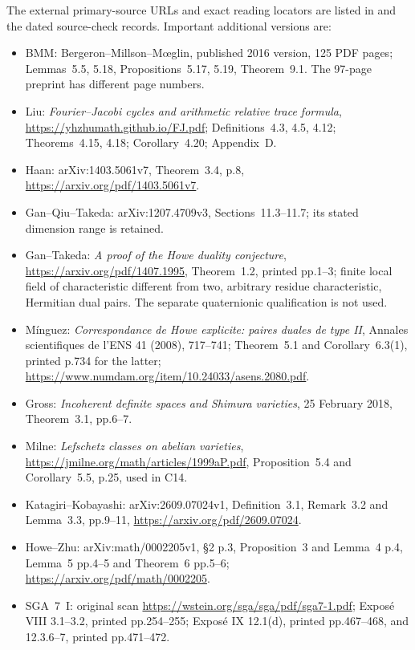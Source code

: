 \documentclass[11pt]{article}
\theoremstyle{definition}\newtheorem{definition}[theorem]{Definition}\newtheorem{remark}[theorem]{Remark}
\begin{document}
The external primary-source URLs and exact reading locators are
listed in  and the
dated source-check records. Important additional versions are:
\begin{itemize}[leftmargin=*]
\item BMM: Bergeron--Millson--M\oe glin, published 2016 version,
125 PDF pages; Lemmas~5.5, 5.18, Propositions~5.17, 5.19,
Theorem~9.1. The 97-page preprint has different page numbers.
\item Liu: \emph{Fourier--Jacobi cycles and arithmetic relative
trace formula}, \url{https://yhzhumath.github.io/FJ.pdf};
Definitions~4.3, 4.5, 4.12; Theorems~4.15, 4.18;
Corollary~4.20; Appendix~D.
\item Haan: arXiv:1403.5061v7, Theorem~3.4, p.8,
\url{https://arxiv.org/pdf/1403.5061v7}.
\item Gan--Qiu--Takeda: arXiv:1207.4709v3,
Sections~11.3--11.7; its stated dimension range is retained.
\item Gan--Takeda: \emph{A proof of the Howe duality conjecture},
\url{https://arxiv.org/pdf/1407.1995}, Theorem~1.2,
printed pp.1--3; finite local field of characteristic different
from two, arbitrary residue characteristic, Hermitian dual pairs.
The separate quaternionic qualification is not used.
\item M\'inguez: \emph{Correspondance de Howe explicite:
paires duales de type II}, Annales scientifiques de l'ENS
41 (2008), 717--741; Theorem~5.1 and Corollary~6.3(1),
printed p.734 for the latter;
\url{https://www.numdam.org/item/10.24033/asens.2080.pdf}.
\item Gross: \emph{Incoherent definite spaces and Shimura varieties},
25 February 2018, Theorem~3.1, pp.6--7.
\item Milne: \emph{Lefschetz classes on abelian varieties},
\url{https://jmilne.org/math/articles/1999aP.pdf},
Proposition~5.4 and Corollary~5.5, p.25, used in C14.
\item Katagiri--Kobayashi: arXiv:2609.07024v1,
Definition~3.1, Remark~3.2 and Lemma~3.3, pp.9--11,
\url{https://arxiv.org/pdf/2609.07024}.
\item Howe--Zhu: arXiv:math/0002205v1,
\S2 p.3, Proposition~3 and Lemma~4 p.4,
Lemma~5 pp.4--5 and Theorem~6 pp.5--6;
\url{https://arxiv.org/pdf/math/0002205}.
\item SGA~7~I: original scan
\url{https://wstein.org/sga/sga/pdf/sga7-1.pdf};
Expos\'e VIII 3.1--3.2, printed pp.254--255;
Expos\'e IX 12.1(d), printed pp.467--468, and
12.3.6--7, printed pp.471--472.

\end{itemize}
\end{document}
